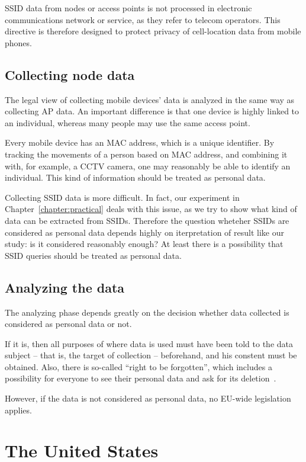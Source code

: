 \documentclass[12pt,a4paper,oneside,pdftex]{report}
\begin{document}
SSID data from nodes or access points is not processed in electronic communications network or service, as they refer to telecom operators. This directive is therefore designed to protect privacy of cell-location data from mobile phones.

\subsection{Collecting node data}

The legal view of collecting mobile devices' data is analyzed in the same way as collecting AP data. An important difference is that one device is highly linked to an individual, whereas many people may use the same access point.

Every mobile device has an MAC address, which is a unique identifier. By tracking the movements of a person based on MAC address, and combining it with, for example, a CCTV camera, one may reasonably be able to identify an individual. This kind of information should be treated as personal data.

Collecting SSID data is more difficult. In fact, our experiment in Chapter~\ref{chapter:practical} deals with this issue, as we try to show what kind of data can be extracted from SSIDs. Therefore the question wheteher SSIDs are considered as personal data depends highly on iterpretation of result like our study: is it considered reasonably enough? At least there is a possibility that SSID queries should be treated as personal data.

\subsection{Analyzing the data}

The analyzing phase depends greatly on the decision whether data collected is considered as personal data or not. 

If it is, then all purposes of where data is used must have been told to the data subject -- that is, the target of collection -- beforehand, and his constent must be obtained. Also, there is so-called ``right to be forgotten'', which includes a possibility for everyone to see their personal data and ask for its deletion~\cite{data_protection}. 

However, if the data is not considered as personal data, no EU-wide legislation applies. 


\section{The United States}
\end{document}
